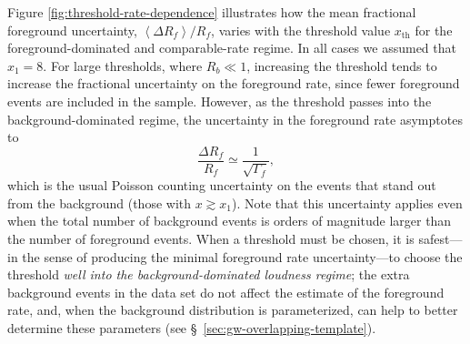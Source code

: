 \documentclass[aps,prd,reprint,nofootinbib]{revtex4-1}
\begin{document}
Figure \ref{fig:threshold-rate-dependence} illustrates how the mean
fractional foreground uncertainty, $\left\langle \Delta R_f
\right\rangle / R_f$, varies with the threshold value $x_\mathrm{th}$
for the foreground-dominated and comparable-rate regime.  In all cases
we assumed that $x_1 = 8$.  For large thresholds, where $R_b \ll 1$,
increasing the threshold tends to increase the fractional uncertainty
on the foreground rate, since fewer foreground events are included in
the sample.  However, as the threshold passes into the
background-dominated regime, the uncertainty in the foreground rate
asymptotes to
\begin{equation}
  \frac{\Delta R_f}{R_f} \simeq \frac{1}{\sqrt{\Gamma_f}},
\end{equation}
which is the usual Poisson counting uncertainty on the events that
stand out from the background (those with $x \gtrsim x_1$).  Note that
this uncertainty applies even when the total number of background
events is orders of magnitude larger than the number of foreground
events.  When a threshold must be chosen, it is safest---in the sense
of producing the minimal foreground rate uncertainty---to choose the
threshold \emph{well into the background-dominated loudness regime};
the extra background events in the data set do not affect the estimate
of the foreground rate, and, when the background distribution is
parameterized, can help to better determine these parameters (see
\S~\ref{sec:gw-overlapping-template}).
\end{document}
